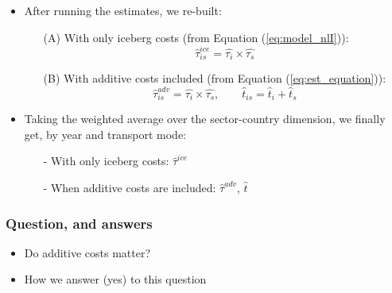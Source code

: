 \documentclass[10 pt,Helvetica, french]{beamer}
\begin{document}
\begin{frame}
\begin{itemize}
\item After running the estimates, we re-built: \vspace{0.1cm}
\begin{itemize}
\item[(A)] With only iceberg costs (from Equation (\ref{eq:model_nlI})):
$$\widehat{\tau}^{ice}_{is} = \widehat{\tau_{i}} \times \widehat{\tau_{s}}$$
\item[(B)] With additive costs included (from Equation (\ref{eq:est_equation})):
$$\widehat{\tau}^{adv}_{is} = \widehat{\tau_{i}} \times \widehat{\tau_{s}}, \qquad \widehat{t}_{is} = \widehat{t}_{i} + \widehat{t}_{s}$$
\end{itemize}
\item  Taking the weighted average over the sector-country dimension, we finally get, by year and transport mode: \vspace{0.1cm}
\begin{itemize}
\item[-] With only iceberg costs: $\widehat{\tau}^{ice}$ \vspace{0.1cm}
\item[-] When additive costs are included: $\widehat{\tau}^{adv}$, $\widehat{t}$

\end{itemize}
\end{itemize}
\end{frame}

\begin{frame}
\frametitle{Question, and answers}
\begin{itemize}
\item Do additive costs matter? \vspace{0.5cm}
\item How we answer (yes) to this question
\end{itemize}
\end{frame}
\end{document}
